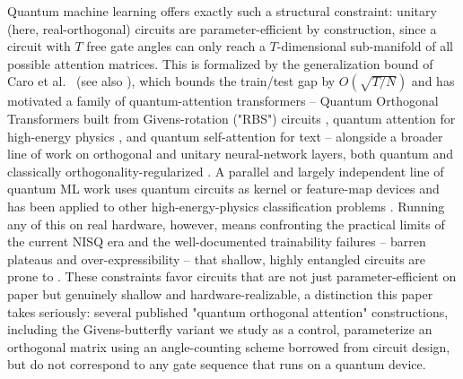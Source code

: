 \documentclass[10pt,letterpaper]{article}
\theoremstyle{plain}
\theoremstyle{definition}
\begin{document}
Quantum machine learning offers exactly such a structural constraint:
unitary (here, real-orthogonal) circuits are parameter-efficient by
construction, since a circuit with $T$ free gate angles can only reach a
$T$-dimensional sub-manifold of all possible attention matrices. This is
formalized by the generalization bound of Caro et al.~\citep{caro2022} (see
also \citep{huang2021power,liu2021rigorous}), which bounds the train/test gap
by $O(\sqrt{T/N})$ and has motivated a family of quantum-attention
transformers -- Quantum Orthogonal Transformers built from Givens-rotation
("RBS") circuits \citep{cherrat2022}, quantum attention for high-energy
physics \citep{tesi2024quantum,unlu2024hybrid,comajoan2024quantum}, and
quantum self-attention for text \citep{li2022quantum} -- alongside a
broader line of work on orthogonal and unitary neural-network layers, both
quantum \citep{kerenidis2021classical,landman2022quantum} and classically
orthogonality-regularized \citep{huang2018orthogonal,fei2022ovit}. A
parallel and largely independent line of quantum ML work uses quantum
circuits as kernel or feature-map devices \citep{havlicek2019supervised,gao2018quantum} and has been applied to other high-energy-physics
classification problems \citep{terashi2021event,ngairangbam2022anomaly}.
Running any of this on real hardware, however, means confronting the
practical limits of the current NISQ era \citep{preskill2018quantum,bharti2022nisq} and the well-documented trainability failures --
barren plateaus and over-expressibility -- that shallow, highly entangled
circuits are prone to \citep{mcclean2018barren,cerezo2021cost,sim2019expressibility}. These constraints favor circuits that are not just
parameter-efficient on paper but genuinely shallow and hardware-realizable,
a distinction this paper takes seriously: several published "quantum
orthogonal attention" constructions, including the Givens-butterfly variant
we study as a control, parameterize an orthogonal matrix using an
angle-counting scheme borrowed from circuit design, but do not correspond
to any gate sequence that runs on a quantum device.
\end{document}
